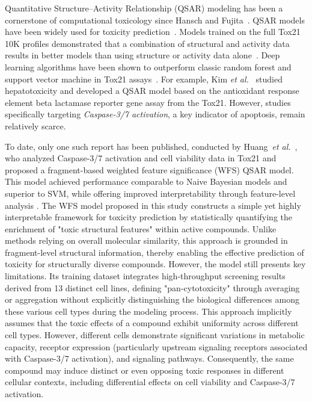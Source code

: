 \documentclass[letterpaper]{article}
\begin{document}
Quantitative Structure–Activity Relationship (QSAR) modeling has been a cornerstone of computational toxicology since Hansch and Fujita~\cite{hansch1964}. QSAR models have been widely used for toxicity prediction~\cite{Tropsha2010}. Models trained on the full Tox21 10K profiles demonstrated that a combination of structural and activity data results in better models than using structure or activity data alone~\cite{Huang2016}. Deep learning algorithms have been shown to outperform classic random forest and support vector machine in Tox21 assays~\cite{Mayr2016}. For example, Kim \emph{et al.}~\cite{kim2015mechanism} studied hepatotoxicity and developed a QSAR model based on the antioxidant response element beta lactamase reporter gene assay from the Tox21. However, studies specifically targeting \emph{Caspase-3/7 activation}, a key indicator of apoptosis, remain relatively scarce.

To date, only one such report has been published, conducted by Huang~\textit{et al.}~\cite{Huang2009}, who analyzed Caspase-3/7 activation and cell viability data in Tox21 and proposed a fragment-based weighted feature significance (WFS) QSAR model. This model achieved performance comparable to Naive Bayesian models and superior to SVM, while offering improved interpretability through feature-level analysis \cite{Huang2009}. The WFS model proposed in this study constructs a simple yet highly interpretable framework for toxicity prediction by statistically quantifying the enrichment of "toxic structural features" within active compounds. Unlike methods relying on overall molecular similarity, this approach is grounded in fragment-level structural information, thereby enabling the effective prediction of toxicity for structurally diverse compounds. However, the model still presents key limitations. Its training dataset integrates high-throughput screening results derived from 13 distinct cell lines, defining "pan-cytotoxicity" through averaging or aggregation without explicitly distinguishing the biological differences among these various cell types during the modeling process. This approach implicitly assumes that the toxic effects of a compound exhibit uniformity across different cell types. However, different cells demonstrate significant variations in metabolic capacity, receptor expression (particularly upstream signaling receptors associated with Caspase-3/7 activation), and signaling pathways. Consequently, the same compound may induce distinct or even opposing toxic responses in different cellular contexts, including differential effects on cell viability and Caspase-3/7 activation.
\end{document}
